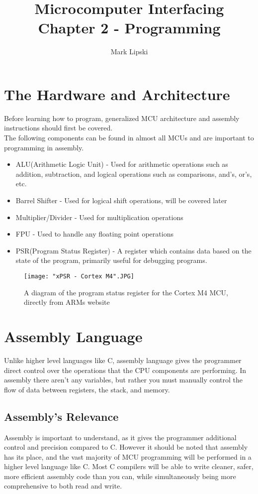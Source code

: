 \documentclass[10pt]{article}
\title{Microcomputer Interfacing Chapter 2 - Programming}
\author{Mark Lipski}
\begin{document}
\maketitle
\section{The Hardware and Architecture}
Before learning how to program, generalized MCU architecture and assembly instructions should first be covered.\\

The following components can be found in almost all MCUs and are important to programming in assembly.
\begin{itemize}
\item ALU(Arithmetic Logic Unit) - Used for arithmetic operations such as addition, subtraction, and logical operations such as comparisons, and's, or's, etc.
\item Barrel Shifter - Used for logical shift operations, will be covered later
\item Multiplier/Divider - Used for multiplication operations
\item FPU - Used to handle any floating point operations
\item PSR(Program Status Register) - A register which contains data based on the state of the program, primarily useful for debugging programs.
\end{itemize}

\begin{figure}[H]
\texttt{[image: "xPSR - Cortex M4".JPG]}
\caption{A diagram of the program status register for the Cortex M4 MCU, directly from ARMs website}
\end{figure}

\section{Assembly Language}
Unlike higher level languages like C, assembly language gives the programmer direct control over the operations that the CPU components are performing. In assembly there aren't any variables, but rather you must manually control the flow of data between registers, the stack, and memory. \\

\subsection{Assembly's Relevance}
Assembly is important to understand, as it gives the programmer additional control and precision compared to C. However it should be noted that assembly has its place, and the vast majority of MCU programming will be performed in a higher level language like C. Most C compilers will be able to write cleaner, safer, more efficient assembly code than you can, while simultaneously being more comprehensive to both read and write.\\
\end{document}
